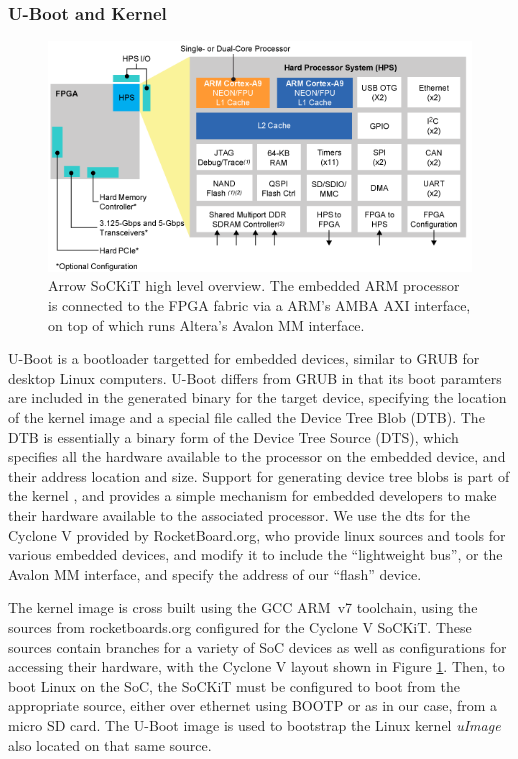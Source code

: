 \documentclass{sig-alternate-10pt}
\begin{document}
\subsubsection{U-Boot and Kernel}
\begin{figure}
	\begin{center}
		\includegraphics[width=0.9\linewidth]{fig/soc_cyclonev.png}
		\caption{
			Arrow SoCKiT high level overview. The embedded ARM processor is connected to the FPGA fabric via a ARM's AMBA AXI interface, on top of which runs Altera's Avalon MM interface.
		}
		\label{fig:cyclone_diag}
	\end{center}
\end{figure}

U-Boot is a bootloader targetted for embedded devices, similar to GRUB for
desktop Linux computers. U-Boot differs from GRUB in that its boot paramters
are included in the generated binary for the target device, specifying the
location of the kernel image and a special file called the Device Tree Blob
(DTB). The DTB is essentially a binary form of the Device Tree Source (DTS),
which specifies all the hardware available to the processor on the embedded
device, and their address location and size. Support for generating device
tree blobs is part of the kernel \cite{dts_linux}, and provides a simple
mechanism for embedded developers to make their hardware available to the
associated processor. We use the dts for the Cyclone V provided by
RocketBoard.org, who provide linux sources and tools for various embedded
devices, and modify it to include the ``lightweight bus'', or the Avalon MM
interface, and specify the address of our ``flash'' device.

The kernel image is cross built using the GCC ARM~v7 toolchain, using the
sources from rocketboards.org configured for the Cyclone V SoCKiT. These
sources contain branches for a variety of SoC devices as well as
configurations for accessing their hardware, with the Cyclone V layout shown
in Figure \ref{fig:cyclone_diag}. Then, to boot Linux on the SoC, the SoCKiT
must be configured to boot from the appropriate source, either over ethernet
using BOOTP or as in our case, from a micro SD card. The U-Boot image is
used to bootstrap the Linux kernel \emph{uImage} also located on that same
source. 
\end{document}
